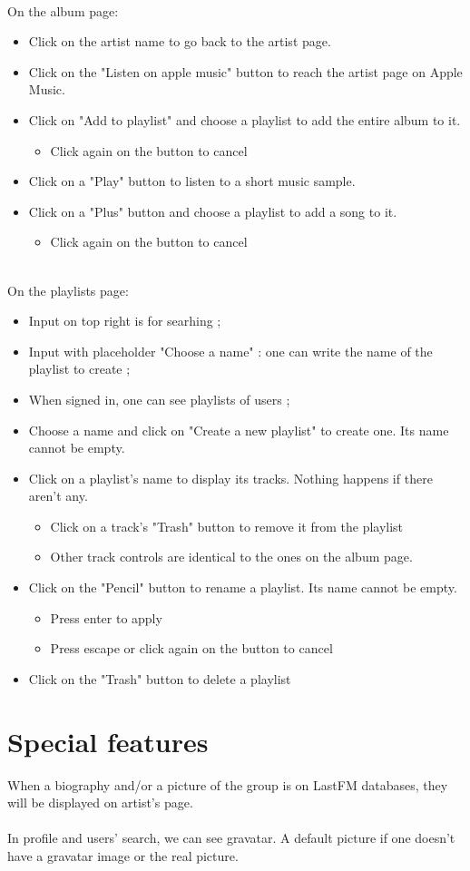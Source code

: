 \documentclass[11pt]{article}
\begin{document}
        \noindent \\
        On the album page:
        \begin{itemize}
        \item Click on the artist name to go back to the artist page.
        \item Click on the "Listen on apple music" button to reach the artist page on Apple Music.
        \item Click on "Add to playlist" and choose a playlist to add the entire album to it.
            \begin{itemize}
            \item Click again on the button to cancel
            \end{itemize}
        \item Click on a "Play" button to listen to a short music sample.
        \item Click on a "Plus" button and choose a playlist to add a song to it.
            \begin{itemize}
            \item Click again on the button to cancel
            \end{itemize}
        \end{itemize}
        
        \noindent \\
        On the playlists page:
        \begin{itemize}
     	\item Input on top right is for searhing ;
        \item Input with placeholder "Choose a name" : one can write the name of the playlist to create ;
   		\item When signed in, one can see playlists of users ;
        \item Choose a name and click on "Create a new playlist" to create one. Its name cannot be empty.
        \item Click on a playlist's name to display its tracks. Nothing happens if there aren't any.
            \begin{itemize}
            \item Click on a track's "Trash" button to remove it from the playlist
            \item Other track controls are identical to the ones on the album page.
            \end{itemize}
        \item Click on the "Pencil" button to rename a playlist. Its name cannot be empty.
            \begin{itemize}
            \item Press enter to apply
            \item Press escape or click again on the button to cancel
            \end{itemize}
        \item Click on the "Trash" button to delete a playlist
        \end{itemize}

	\section{Special features}
	\noindent
	When a biography and/or a picture of the group is on LastFM databases, they will be displayed on artist's page.
	\\
	\\
	In profile and users' search, we can see gravatar. A default picture if one doesn't have a gravatar image or the real picture.
\end{document}
